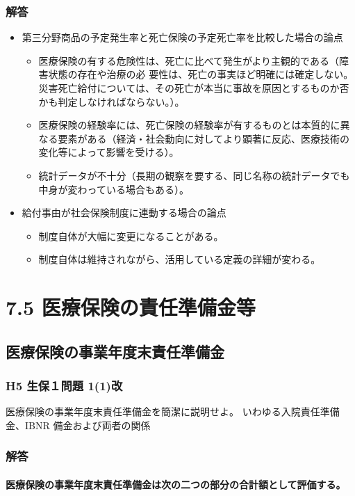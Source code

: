 \documentclass[report,gutter=10mm,fore-edge=10mm,uplatex,dvipdfmx]{jlreq}
\begin{document}
\subsubsection{解答}
\begin{itemize}
 \item 第三分野商品の予定発生率と死亡保険の予定死亡率を比較した場合の論点
\begin{itemize}
 \item 医療保険の有する危険性は、死亡に比べて発生がより主観的である（障害状態の存在や治療の必
要性は、死亡の事実ほど明確には確定しない。災害死亡給付については、その死亡が本当に事故を原因とするものか否かも判定しなければならない。）。
 \item 医療保険の経験率には、死亡保険の経験率が有するものとは本質的に異なる要素がある（経済・社会動向に対してより顕著に反応、医療技術の変化等によって影響を受ける）。
 \item 統計データが不十分（長期の観察を要する、同じ名称の統計データでも中身が変わっている場合もある）。
\end{itemize}
 \item 給付事由が社会保険制度に連動する場合の論点
\begin{itemize}
 \item 制度自体が大幅に変更になることがある。
 \item 制度自体は維持されながら、活用している定義の詳細が変わる。
\end{itemize}
\end{itemize}
\section{7.5 医療保険の責任準備金等}
\subsection{医療保険の事業年度末責任準備金}


\subsubsection{H5 生保１問題 1(1)改}
医療保険の事業年度末責任準備金を簡潔に説明せよ。
いわゆる入院責任準備金、IBNR 備金および両者の関係
\subsubsection{解答}

\paragraph{医療保険の事業年度末責任準備金は次の二つの部分の合計額として評価する。}
\end{document}
